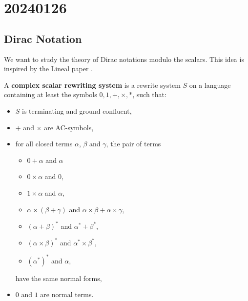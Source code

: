 \chapter{20240126}

\newcommand*{\unit}{\texttt{unit}}
\newcommand*{\utt}{\texttt{tt}}
\newcommand*{\fst}{\texttt{fst}}
\newcommand*{\snd}{\texttt{snd}}
\newcommand*{\reduce}{\ \triangleright\ }
\newcommand*{\reducefrom}{\ \triangleleft\ }

\newcommand*{\zeroK}[1]{\mathbf{0}_{\mathcal{K}(#1)}}
\newcommand*{\zeroB}[1]{\mathbf{0}_{\mathcal{B}(#1)}}
\newcommand*{\zeroO}[1]{\mathbf{0}_{\mathcal{O}(#1)}}

\section{Dirac Notation}

We want to study the theory of Dirac notations modulo the scalars. This idea is inspired by the Lineal paper \cite{Arrighi2017}.

\begin{definition}
  A \textbf{complex scalar rewriting system} is a rewrite system $S$ on a language containing at least the symbols $0, 1, +, \times, *$, such that:
  \begin{itemize}
    \item $S$ is terminating and ground confluent,
    \item $+$ and $\times$ are AC-symbols,
    \item for all closed terms $\alpha$, $\beta$ and $\gamma$, the pair of terms
      \begin{itemize}
        \item $0 + \alpha$ and $\alpha$
        \item $0 \times \alpha$ and $0$,
        \item $1 \times \alpha$ and $\alpha$,
        \item $\alpha \times (\beta + \gamma)$ and $\alpha \times \beta + \alpha \times \gamma$,
        \item $(\alpha + \beta)^*$ and $\alpha^* + \beta^*$,
        \item $(\alpha \times \beta)^*$ and $\alpha^* \times \beta^*$,
        \item $(\alpha^*)^*$ and $\alpha$,
      \end{itemize}
      have the same normal forms,
    \item $0$ and $1$ are normal terms.
  \end{itemize}
\end{definition}

